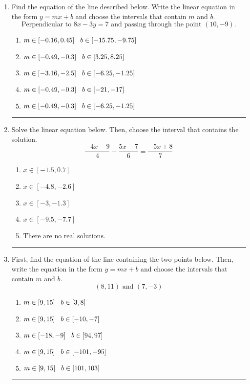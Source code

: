 \documentclass[14pt]{extbook}
\newcommand{\litem}[1]{\item#1\hspace*{-1cm}\rule{\textwidth}{0.4pt}}
\begin{document}
\begin{enumerate}
{\begin{enumerate}[label=\Alph*.]
\end{enumerate} }
\litem{
Find the equation of the line described below. Write the linear equation in the form $ y=mx+b $ and choose the intervals that contain $m$ and $b$.\[ \text{Perpendicular to } 8 x - 3 y = 7 \text{ and passing through the point } (10, -9). \]\begin{enumerate}[label=\Alph*.]
\item \( m \in [-0.16, 0.45] \hspace*{3mm} b \in [-15.75, -9.75] \)
\item \( m \in [-0.49, -0.3] \hspace*{3mm} b \in [3.25, 8.25] \)
\item \( m \in [-3.16, -2.5] \hspace*{3mm} b \in [-6.25, -1.25] \)
\item \( m \in [-0.49, -0.3] \hspace*{3mm} b \in [-21, -17] \)
\item \( m \in [-0.49, -0.3] \hspace*{3mm} b \in [-6.25, -1.25] \)

\end{enumerate} }
\litem{
Solve the linear equation below. Then, choose the interval that contains the solution.\[ \frac{-4x -9}{4} - \frac{5x -7}{6} = \frac{-5x + 8}{7} \]\begin{enumerate}[label=\Alph*.]
\item \( x \in [-1.5, 0.7] \)
\item \( x \in [-4.8, -2.6] \)
\item \( x \in [-3, -1.3] \)
\item \( x \in [-9.5, -7.7] \)
\item \( \text{There are no real solutions.} \)

\end{enumerate} }
\litem{
First, find the equation of the line containing the two points below. Then, write the equation in the form $ y=mx+b $ and choose the intervals that contain $m$ and $b$.\[ (8, 11) \text{ and } (7, -3) \]\begin{enumerate}[label=\Alph*.]
\item \( m \in [9, 15] \hspace*{3mm} b \in [3, 8] \)
\item \( m \in [9, 15] \hspace*{3mm} b \in [-10, -7] \)
\item \( m \in [-18, -9] \hspace*{3mm} b \in [94, 97] \)
\item \( m \in [9, 15] \hspace*{3mm} b \in [-101, -95] \)
\item \( m \in [9, 15] \hspace*{3mm} b \in [101, 103] \)


\end{enumerate}}
\end{enumerate}
\end{document}
